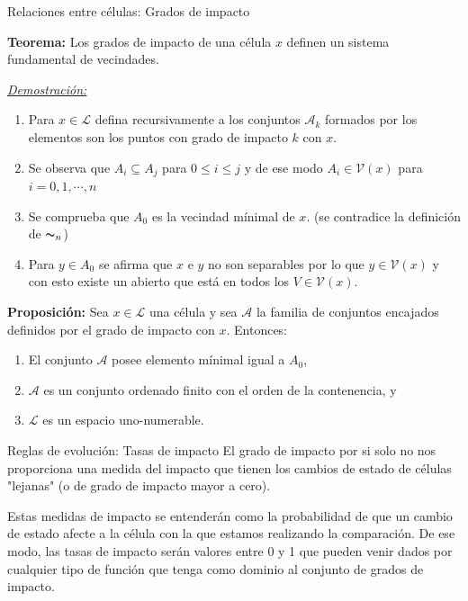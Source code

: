 \documentclass[9pt]{beamer}
\begin{document}
\begin{frame}{Relaciones entre células: Grados de impacto}

\textbf{Teorema:} Los grados de impacto de una célula $x$ definen un sistema fundamental de vecindades.

\underline{\textit{Demostración:}}
\begin{enumerate}
    \item Para $x\in\mathcal{L}$ defina recursivamente a los conjuntos $\mathcal{A}_k$ formados por los elementos son los puntos con grado de impacto $k$ con $x$.
    \item Se observa que $A_i\subseteq A_j$ para $0\leq i\leq j$ y de ese modo $A_i\in\mathcal{V}(x)$ para $i=0,1,\cdots,n$
    \item Se comprueba que $A_0$ es la vecindad mínimal de $x$. (se contradice la definición de $\thicksim_n$)
    \item Para $y\in A_0$ se afirma que $x$ e $y$ no son separables por lo que $y\in\mathcal{V}(x)$ y con esto existe un abierto que está en todos los $V\in\mathcal{V}(x)$.
\end{enumerate}

\textbf{Proposición:} Sea $x\in\mathcal{L}$ una célula y sea $\mathcal{A}$ la familia de conjuntos encajados definidos por el grado de impacto con $x$. Entonces:
\begin{enumerate}
    \item El conjunto $\mathcal{A}$ posee elemento mínimal igual a $A_0$,
    \item $\mathcal{A}$ es un conjunto ordenado finito con el orden de la contenencia, y
    \item $\mathcal{L}$ es un espacio uno-numerable.
\end{enumerate}

\end{frame}

\begin{frame}{Reglas de evolución: Tasas de impacto}
El grado de impacto por si solo no nos proporciona una medida del impacto que tienen los cambios de estado de células "lejanas" (o de grado de impacto mayor a cero). 

Estas medidas de impacto se entenderán como la probabilidad de que un cambio de estado afecte a la célula con la que estamos realizando la comparación. De ese modo, las tasas de impacto serán valores entre 0 y 1 que pueden venir dados por cualquier tipo de función que tenga como dominio al conjunto de grados de impacto.
\end{frame}
\end{document}
